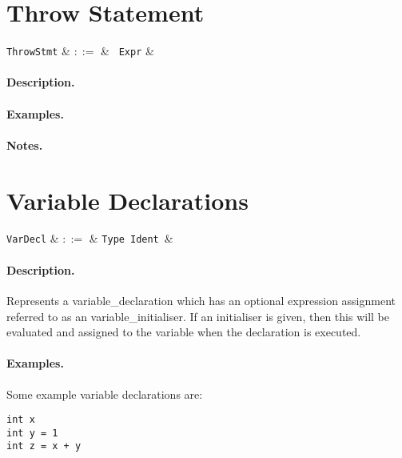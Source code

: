 
\section{Throw Statement}

\begin{syntax}
  \verb+ThrowStmt+ & $::=$ & \ \verb+Expr+ &\\
\end{syntax}

\paragraph{Description.}

\paragraph{Examples.}

\paragraph{Notes.} 


\section{Variable Declarations}

\begin{syntax}
  \verb+VarDecl+ & $::=$ & \verb+Type+\ \verb+Ident+\ \big[\
  \token{=}\ \verb+Expr+\ \big]&\\
\end{syntax}

\paragraph{Description.}  Represents a \gls{variable_declaration}
which has an optional expression assignment referred to as an
\gls{variable_initialiser}.  If an initialiser is given, then this will be evaluated and assigned to the variable when the declaration is executed.

\paragraph{Examples.} Some example variable declarations are:
\begin{lstlisting}
int x
int y = 1
int z = x + y
\end{lstlisting}

